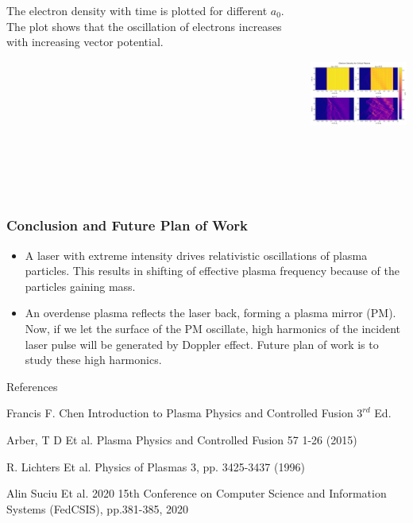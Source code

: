 \documentclass{beamer}
\begin{document}
\begin{frame}
    \small
    \begin{columns}
        \begin{column}{0.3\textwidth}
            The electron density with time is plotted for different $a_0$. The plot shows that the oscillation of electrons increases with increasing vector potential.
        \end{column}
        \begin{column}{0.7\textwidth}
            \includegraphics[width=8cm, height=6cm]{density.png}
        \end{column}
    \end{columns}
\end{frame}
\begin{frame}
    \frametitle{Conclusion and Future Plan of Work}
    \small
    \begin{itemize}
        \item A laser with extreme intensity drives relativistic oscillations of plasma particles. This results in shifting of effective plasma frequency because of the particles gaining mass.
        \item An overdense plasma reflects the laser back, forming a plasma mirror (PM). Now, if we let the surface of the PM oscillate, high harmonics of the incident laser pulse will be generated by Doppler effect.\cite{lichters} Future plan of work is to study these high harmonics.
    \end{itemize}
    \Large References
    \small
    \begin{thebibliography}{9}
        Francis F. Chen
        Introduction to Plasma Physics and Controlled Fusion $3^{rd}$ Ed.

        Arber, T D Et al. Plasma Physics and Controlled Fusion 57 1-26 (2015)

        R. Lichters Et al. Physics of Plasmas 3, pp. 3425-3437 (1996)

        Alin Suciu Et al. 2020 15th Conference on Computer Science and Information Systems (FedCSIS), pp.381-385, 2020

    \end{thebibliography}
\end{frame}
\end{document}
